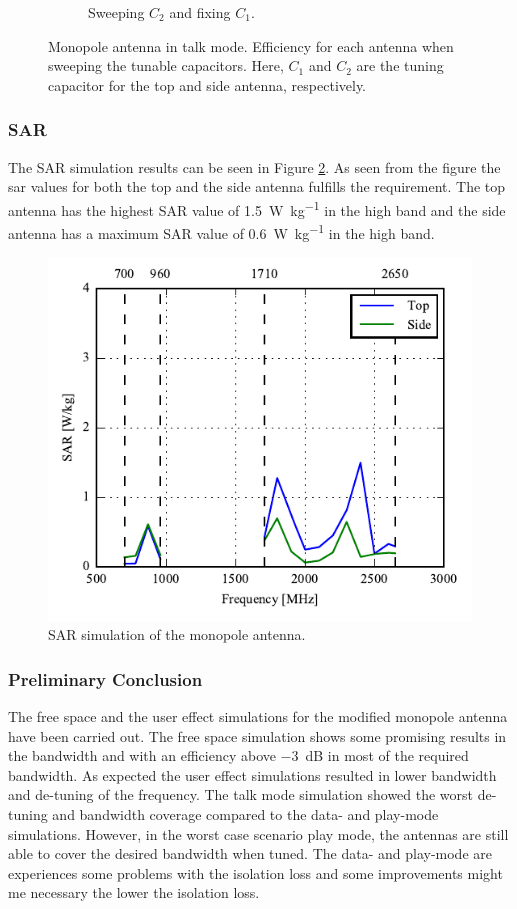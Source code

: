 \begin{figure}[htbp]
\begin{subfigure}{0.49\linewidth}
        \caption{Sweeping $C_2$ and fixing $C_1$.}
    \end{subfigure}
    \caption{Monopole antenna in talk mode. Efficiency for each antenna when sweeping the tunable capacitors. Here, $C_1$ and $C_2$ are the tuning capacitor for the top and side antenna, respectively.}
    \label{fig:eff_mono_modi_talk_mode}
\end{figure}

\FloatBarrier
\subsubsection{SAR}
The SAR simulation results can be seen in Figure \ref{fig:sar_mono_modi}. As seen from the figure the sar values for both the top and the side antenna fulfills the requirement. The top antenna has the highest SAR value of \SI{1.5}{W\per kg} in the high band and the side antenna has a maximum SAR value of \SI{0.6}{W\per kg} in the high band. 
\begin{figure}[htbp]
    \centering
    \includegraphics{img/tech_sol/monopole/highband/ue/sar/sar.pdf}
    \caption{SAR simulation of the monopole antenna.}
    \label{fig:sar_mono_modi}
\end{figure}

\subsubsection{Preliminary Conclusion}
The free space and the user effect simulations for the modified monopole antenna have been carried out. The free space simulation shows some promising results in the bandwidth and with an efficiency above \SI{-3}{dB} in most of the required bandwidth. As expected the user effect simulations resulted in lower bandwidth and de-tuning of the frequency. The talk mode simulation showed the worst de-tuning and bandwidth coverage compared to the data- and play-mode simulations. However, in the worst case scenario play mode, the antennas are still able to cover the desired bandwidth when tuned. 
The data- and play-mode are experiences some problems with the isolation loss and some improvements might me necessary the lower the isolation loss.

